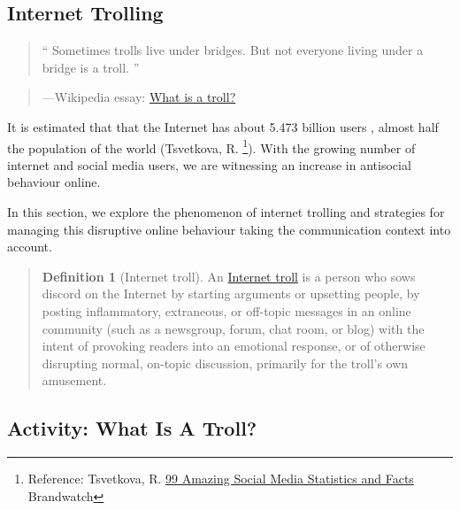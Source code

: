 \documentclass[
]{book}
\theoremstyle{definition}
\newtheorem{definition}{Definition}[chapter]
\theoremstyle{definition}
\theoremstyle{definition}
\theoremstyle{definition}
\theoremstyle{remark}
\begin{document}
\hypertarget{internet-trolling}{%
\subsection*{Internet Trolling}\label{internet-trolling}}

\begin{quote}
`` Sometimes trolls live under bridges. But not everyone living under a bridge is a troll. ''
\end{quote}

\begin{quote}
---Wikipedia essay: \href{https://meta.wikimedia.org/wiki/What_is_a_troll\%3F}{What is a troll?}
\end{quote}

It is estimated that that the Internet has about 5.473 billion users , almost half the population of the world (Tsvetkova, R. \footnote{Reference: Tsvetkova, R. \href{https://www.brandwatch.com/blog/amazing-social-media-statistics-and-facts/}{99 Amazing Social Media Statistics and Facts} Brandwatch}). With the growing number of internet and social media users, we are witnessing an increase in antisocial behaviour online.

In this section, we explore the phenomenon of internet trolling and strategies for managing this disruptive online behaviour taking the communication context into account.

\begin{quote}
\begin{definition}[Internet troll]
\protect\hypertarget{def:troll}{}\label{def:troll}An \href{https://en.wikipedia.org/wiki/Troll_(slang)}{Internet troll} is a person who sows discord on the Internet by starting arguments or upsetting people, by posting inflammatory, extraneous, or off-topic messages in an online community (such as a newsgroup, forum, chat room, or blog) with the intent of provoking readers into an emotional response, or of otherwise disrupting normal, on-topic discussion, primarily for the troll's own amusement.
\end{definition}
\end{quote}

\hypertarget{activity-what-is-a-troll}{%
\subsection*{Activity: What Is A Troll?}\label{activity-what-is-a-troll}}
\end{document}
